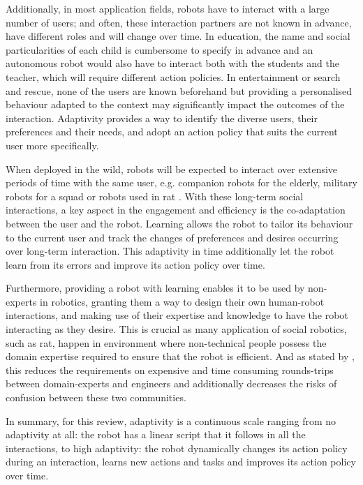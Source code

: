     Additionally, in most application fields, robots have to interact with a large number of users; and often, these interaction partners are not known in advance, have different roles and will change over time. In education, the name and social particularities of each child is cumbersome to specify in advance and an autonomous robot would also have to interact both with the students and the teacher, which will require different action policies. In entertainment or search and rescue, none of the users are known beforehand but providing a personalised behaviour adapted to the context may significantly impact the outcomes of the interaction. Adaptivity provides a way to identify the diverse users, their preferences and their needs, and adopt an action policy that suits the current user more specifically. %
    
    When deployed in the wild, robots will be expected to interact over extensive periods of time with the same user, e.g. companion robots for the elderly, military robots for a squad or robots used in \gls{rat} \citep{leite2013social}. With these long-term social interactions, a key aspect in the engagement and efficiency is  the co-adaptation between the user and the robot. Learning allows the robot to tailor its behaviour to the current user and track the changes of preferences and desires occurring over long-term interaction. This adaptivity in time additionally let the robot learn from its errors and improve its action policy over time. 

	Furthermore, providing a robot with learning enables it to be used by non-experts in robotics, granting them a way to design their own human-robot interactions, and making use of their expertise and knowledge to have the robot interacting as they desire. This is crucial as many application of social robotics, such as \gls{rat}, happen in environment where non-technical people possess the domain expertise required to ensure that the robot is efficient. And as stated by \cite{amershi2014power}, this reduces the requirements on expensive and time consuming rounds-trips between domain-experts and engineers and additionally decreases the risks of confusion between these two communities.

    In summary, for this review, adaptivity is a continuous scale ranging from no adaptivity at all: the robot has a linear script that it follows in all the interactions, to high adaptivity: the robot dynamically changes its action policy during an interaction, learns new actions and tasks and improves its action policy over time. 

